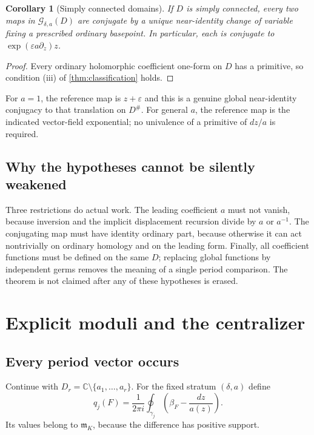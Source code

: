 \documentclass[11pt,a4paper]{article}
\numberwithin{equation}{section}
\newtheorem{corollary}[corollary]{Corollary}
\theoremstyle{definition}
\theoremstyle{remark}
\newcommand{\C}{\mathbb C}
\newcommand{\G}{\mathcal G}
\newcommand{\mm}{\mathfrak m}
\newcommand{\eps}{\varepsilon}
\begin{document}
\begin{corollary}[Simply connected domains]\label{cor:simplyconnected}
If $D$ is simply connected, every two maps in $\G_{\delta,a}(D)$ are
conjugate by a unique near-identity change of variable fixing a prescribed
ordinary basepoint.  In particular, each is conjugate to
$\exp(\eps a\partial_z)z$.
\end{corollary}
\begin{proof}
Every ordinary holomorphic coefficient one-form on $D$ has a primitive,
so condition (iii) of \cref{thm:classification} holds.
\end{proof}

For $a=1$, the reference map is $z+\eps$ and this is a genuine global
near-identity conjugacy to that translation on $D^\#$.  For general $a$,
the reference map is the indicated vector-field exponential; no
univalence of a primitive of $dz/a$ is required.

\subsection{Why the hypotheses cannot be silently weakened}

Three restrictions do actual work.  The leading coefficient $a$ must not
vanish, because inversion and the implicit displacement recursion divide by
$a$ or $a^{-1}$.  The conjugating map must have identity ordinary part,
because otherwise it can act nontrivially on ordinary homology and on the
leading form.  Finally, all coefficient functions must be defined on the
same $D$; replacing global functions by independent germs removes the
meaning of a single period comparison.  The theorem is not claimed after
any of these hypotheses is erased.

\section{Explicit moduli and the centralizer}
\label{sec:moduli}

\subsection{Every period vector occurs}

Continue with $D_r=\C\setminus\{a_1,\ldots,a_r\}$.  For the fixed
stratum $(\delta,a)$ define
\begin{equation}\label{eq:moduli-map}
 q_j(F)=\frac1{2\pi i}\oint_{\gamma_j}
          \left(\beta_F-\frac{dz}{a(z)}\right).
\end{equation}
Its values belong to $\mm_K$, because the difference has positive support.
\end{document}
